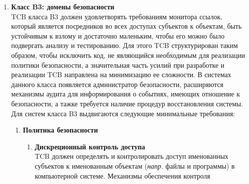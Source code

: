 \begin{enumerate}
\begin{enumerate}
\begin{enumerate}
\begin{enumerate}
\begin{itemize}
					Формальная модель политики безопасности, соответствующая своим аксиомам и реализованная в TCB, должна поддерживаться на протяжении всего жизненного цикла системы.
					\item{\textbf{Управление конфигурацией}}\\
					В процессе разработки и сопровождения TCB должна быть внедрена система управления конфигурацией, которая обеспечивает контроль изменений в спецификации верхнего уровня,
					других данных проекта, документации по реализации, исходном коде, рабочей версии объектного кода, а также тестовых артефактах и документации системы. Система управления
					конфигурацией должна обеспечивать согласованное отображение всей документации и кода, связанных с текущей версией TCB. Должны быть предусмотрены средства для
					генерации новой версии TCB из исходного кода. Также должны быть предусмотрены средства для сравнения вновь созданной версии с предыдущей версией TCB, чтобы убедиться,
					что в код, который будет фактически использоваться в качестве новой версии TCB, были внесены только предполагаемые изменения.
				\end{itemize}
			\end{enumerate}
		\end{enumerate}
		\item{\textbf{Класс B3: домены безопасности}}\\
		TCB класса B3 должен удовлетворять требованиям монитора ссылок, который является посредников во всех доступах субъектов к объектам, быть устойчивым к взлому и достаточно маленьким,
		чтобы его можно было подвергать анализу и тестированию. Для этого TCB структурирован таким образом, чтобы исключить код, не являющийся необходимым для реализации политики безопасности,
		а значительная часть усилий при разработке и реализации TCB направлена на минимизацию ее сложности. В системах данного класса появляется администратор безопасности, расширяются механизмы
		аудита для информирования о событиях, имеющих отношение к безопасности, а тажке требуется наличие процедур восстановления системы. Для систем класса B3 выдвигаются следующие минимальные
		требования:
        \begin{enumerate}
            \item{\textbf{Политика безопасности}}
            \begin{enumerate}
                \item{\textbf{Дискреционный контроль доступа}}\\
                TCB должен определять и контролировать доступ именованных субъектов к именованным объектам (\textit{напр.} файлы и программы) в компьютерной системе. Механизмы обеспечения контроля

\end{enumerate}
\end{enumerate}
\end{enumerate}
\end{enumerate}
